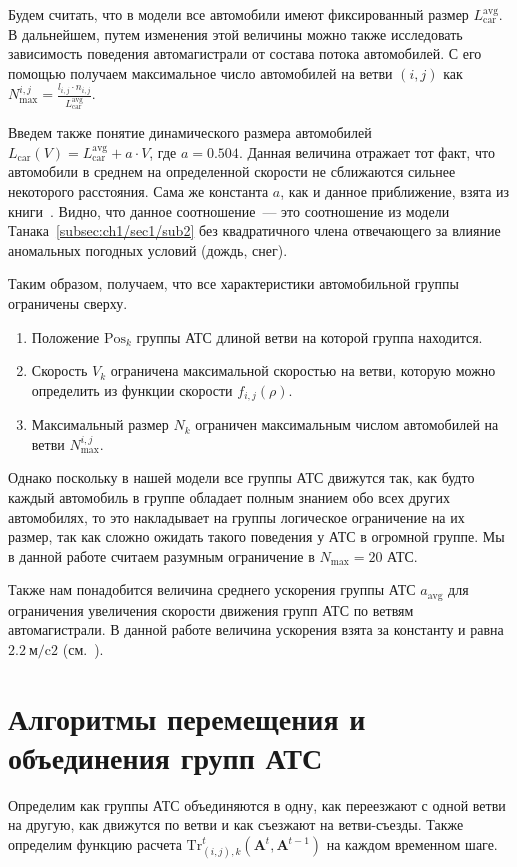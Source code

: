 Будем считать, что в модели все автомобили имеют фиксированный размер \(L_\text{car}^\text{avg}\).
В дальнейшем, путем изменения этой величины можно также исследовать зависимость поведения автомагистрали от состава потока автомобилей.
С его помощью получаем максимальное число автомобилей на ветви \((i,j)\) как \(N^{i,j}_\text{max} = \frac{l_{i,j} \cdot n_{i, j}}{L_\text{car}^\text{avg}}\).

Введем также понятие динамического размера автомобилей \(L_\text{car}(V) = L_\text{car}^\text{avg} + a\cdot V\), где \(a = 0.504\).
Данная величина отражает тот факт, что автомобили в среднем на определенной скорости не сближаются сильнее некоторого расстояния.
Сама же константа \(a\), как и данное приближение, взята из книги~\cite{gasn2017introd}.
Видно, что данное соотношение~--- это соотношение из модели Танака~\ref{subsec:ch1/sec1/sub2} без квадратичного члена отвечающего за влияние аномальных погодных условий (дождь, снег).

Таким образом, получаем, что все характеристики автомобильной группы ограничены сверху.
\begin{enumerate}
  \item Положение \(\mathrm{Pos}_k\) группы АТС длиной ветви на которой группа находится.
  \item Скорость \(V_k\) ограничена максимальной скоростью на ветви, которую можно определить из функции скорости $f_{i,j}(\rho)$.
  \item Максимальный размер \(N_k\) ограничен максимальным числом автомобилей на ветви \(N^{i,j}_\text{max}\).
\end{enumerate}

Однако поскольку в нашей модели все группы АТС движутся так, как будто каждый автомобиль в группе обладает полным знанием обо всех других автомобилях, то это накладывает на группы логическое ограничение на их размер, так как сложно ожидать такого поведения у АТС в огромной группе.
Мы в данной работе считаем разумным ограничение в \(N_\text{max} = 20\) АТС.

Также нам понадобится величина среднего ускорения группы АТС \(a_\text{avg}\) для ограничения увеличения скорости движения групп АТС по ветвям автомагистрали.
В данной работе величина ускорения взята за константу и равна \(2.2\ \text{м/c2}\) (см.~\cite{long2000acceleration}).


\section{Алгоритмы перемещения и объединения групп АТС}
\label{sec:calc_functions}
Определим как группы АТС объединяются в одну, как переезжают с одной ветви на другую, как движутся по ветви и как съезжают на ветви-съезды.
Также определим функцию расчета \(\text{Tr}_{(i, j), k}^t (\mathbf{A}^t, \mathbf{A}^{t-1})\) на каждом временном шаге.

